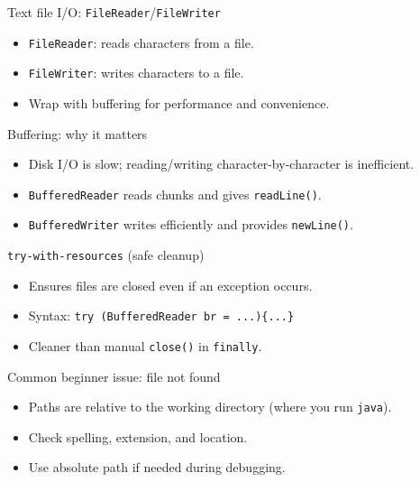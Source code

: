 \documentclass{beamer}
\begin{document}
\begin{frame}{Text file I/O: \texttt{FileReader}/\texttt{FileWriter}}
  \begin{itemize}[<+->]
    \item \texttt{FileReader}: reads characters from a file.
    \item \texttt{FileWriter}: writes characters to a file.
    \item Wrap with buffering for performance and convenience.
  \end{itemize}
  \slidesources{\OOPSUnitIIISources}
\end{frame}

\begin{frame}{Buffering: why it matters}
  \begin{itemize}[<+->]
    \item Disk I/O is slow; reading/writing character-by-character is inefficient.
    \item \texttt{BufferedReader} reads chunks and gives \texttt{readLine()}.
    \item \texttt{BufferedWriter} writes efficiently and provides \texttt{newLine()}.
  \end{itemize}
  \slidesources{\OOPSUnitIIISources}
\end{frame}

\begin{frame}{\texttt{try-with-resources} (safe cleanup)}
  \begin{itemize}[<+->]
    \item Ensures files are closed even if an exception occurs.
    \item Syntax: \texttt{try (BufferedReader br = ...)\{...\}}
    \item Cleaner than manual \texttt{close()} in \texttt{finally}.
  \end{itemize}
  \slidesources{\OOPSUnitIIISources}
\end{frame}

\begin{frame}{Common beginner issue: file not found}
  \begin{itemize}[<+->]
    \item Paths are relative to the working directory (where you run \texttt{java}).
    \item Check spelling, extension, and location.
    \item Use absolute path if needed during debugging.
  \end{itemize}
  \slidesources{\OOPSUnitIIISources}
\end{frame}
\end{document}
